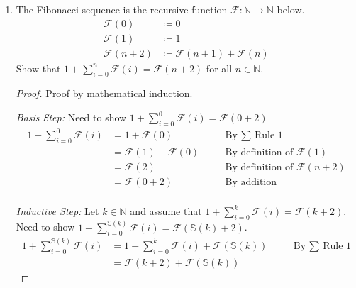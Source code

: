 \documentclass{article}
\newcommand{\defeq}{\coloneqq}
\newcommand{\naturals}{\mathbb{N}}
\newcommand{\s}{\mathbb{S}}
\newcommand{\divides}{\:\mathbb{|}\: }
\newcommand{\fibonacci}{\mathcal{F}}
\newenvironment{case}[1][Case]
    {\par\textit{#1:}\hfill\break}
    {}
\begin{document}
\begin{enumerate}
\begin{proof}
\begin{case}[Inductive Step]
        \end{case}
        Thus by mathematical induction, we can conclude $3 \divides n^3 - n$ for all $n \in \naturals$. 
    \end{proof}
\pagebreak
  \item The Fibonacci sequence is the recursive function $\fibonacci: \naturals \to \naturals$ below.
    \begin{align*}
        \fibonacci(0) &\defeq 0 \\
        \fibonacci(1) &\defeq 1 \\
        \fibonacci(n + 2) &\defeq \fibonacci(n + 1) + \fibonacci(n)
    \end{align*}
    Show that $1 + \displaystyle\sum_{i = 0}^{n}\fibonacci(i) = \fibonacci(n + 2)$ for all $n \in \naturals$.
    \begin{proof} Proof by mathematical induction.
        \begin{case}[Basis Step] 
        Need to show $1 + \displaystyle\sum_{i = 0}^{0}\fibonacci(i) = \fibonacci(0+2)$
        \begin{align*}
          1 + \displaystyle\sum_{i = 0}^{0}\fibonacci(i)
            &=1+\fibonacci(0)
            &\quad
            &\text{By $\sum$ Rule 1}
              \\
            &=\fibonacci(1)+\fibonacci(0)
            &\quad
            &\text{By definition of } \fibonacci(1)
              \\
            &=\fibonacci(2)
            &\quad
            &\text{By definition of } \fibonacci(n+2)
              \\
            &=\fibonacci(0+2)
            &\quad
            &\text{By addition}
              \\
        \end{align*}
        \end{case}
        \begin{case}[Inductive Step]
        Let $k \in \naturals$ and assume that $1 + \displaystyle\sum_{i = 0}^{k}\fibonacci(i) = \fibonacci(k + 2)$.\\
        Need to show $1 + \displaystyle\sum_{i = 0}^{\s(k)}\fibonacci(i) = \fibonacci(\s(k) + 2)$.
        \begin{align*}
          1 + \displaystyle\sum_{i = 0}^{\s(k)}\fibonacci(i)
            &=1+\displaystyle\sum_{i = 0}^{k}\fibonacci(i)+\fibonacci(\s(k))
            &\quad
            &\text{By $\sum$ Rule 1}
              \\
            &=\fibonacci(k + 2)+\fibonacci(\s(k))

\end{align*}
\end{case}
\end{proof}
\end{enumerate}
\end{document}
